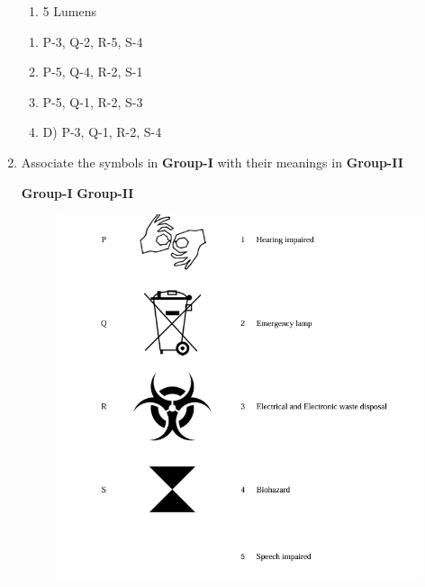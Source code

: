 \documentclass[journal,15pt,onecolumn]{IEEEtran}
\theoremstyle{remark}
\begin{document}
\begin{enumerate}
\begin{enumerate}
                    \item  5  Lumens
\end{enumerate}

\vspace{0.5cm}





\begin{enumerate}

\item   P-3, Q-2, R-5, S-4 
\item   P-5, Q-4, R-2, S-1 
\item   P-5, Q-1, R-2, S-3
\item D) P-3, Q-1, R-2, S-4 
\end{enumerate}


\item 
Associate the symbols in \textbf{Group-I} with their meanings in \textbf{Group-II}




 
\vspace{0.15cm}

\textbf{Group-I}\hspace{8cm} \textbf{Group-II} 



\begin{figure} [h!]
    \centering
    \includegraphics[width=1\linewidth]{figs/29.png}
  \end{figure}


\end{enumerate}
\end{document}
